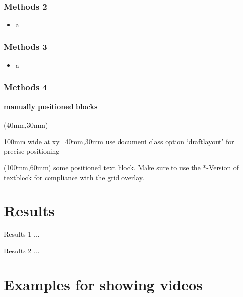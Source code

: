 \documentclass[student, noshadow, lsr, english, aspectratio=169]{ITR_LSR_slides}
\begin{document}
\begin{frame}
	\frametitle{Methods 2}
	\begin{itemize}
		\item a
	\end{itemize}
\end{frame}

\begin{frame}
	\frametitle{Methods 3}
	\begin{itemize}
		\item a
	\end{itemize}
\end{frame}

\begin{frame}
	\frametitle{Methods 4}
	\framesubtitle{manually positioned blocks}
	
	
	\begin{textblock*}{100mm}(40mm,30mm) 
		\begin{tcolorbox}\color{tum_blue}
			100mm wide at xy={40mm,30mm}
			use document class option `draftlayout' for precise positioning
		\end{tcolorbox}
	\end{textblock*}
	
	\begin{textblock*}{55mm}(100mm,60mm) 
		some positioned text block. 
		Make sure to use the *-Version of textblock for compliance with the grid overlay.
	\end{textblock*}
\end{frame}


\section{Results}

\begin{frame}{Results 1}
	...
\end{frame}

\begin{frame}{Results 2}
	...
\end{frame}

\section[Videos]{Examples for showing videos}
	
\end{document}

